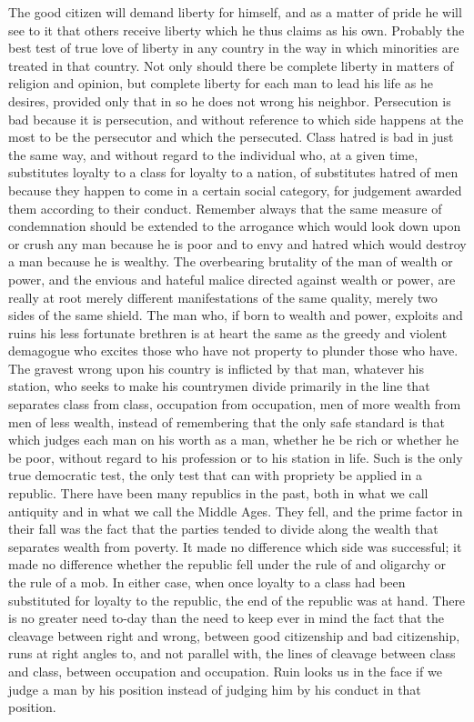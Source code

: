 \documentclass{scrbook}
\begin{document}
The good citizen will demand liberty for himself, and as a matter of pride he will see
to it that others receive liberty which he thus claims as his own. Probably the best test of
true love of liberty in any country in the way in which minorities are treated in that country.
Not only should there be complete liberty in matters of religion and opinion, but complete
liberty for each man to lead his life as he desires, provided only that in so he does not
wrong his neighbor. Persecution is bad because it is persecution, and without reference
to which side happens at the most to be the persecutor and which the persecuted. Class
hatred is bad in just the same way, and without regard to the individual who, at a given time,
substitutes loyalty to a class for loyalty to a nation, of substitutes hatred of men because they
happen to come in a certain social category, for judgement awarded them according to their
conduct. Remember always that the same measure of condemnation should be extended to
the arrogance which would look down upon or crush any man because he is poor and to envy
and hatred which would destroy a man because he is wealthy. The overbearing brutality of
the man of wealth or power, and the envious and hateful malice directed against wealth or
power, are really at root merely different manifestations of the same quality, merely two
sides of the same shield. The man who, if born to wealth and power, exploits and ruins
his less fortunate brethren is at heart the same as the greedy and violent demagogue who
excites those who have not property to plunder those who have. The gravest wrong upon his
country is inflicted by that man, whatever his station, who seeks to make his countrymen
divide primarily in the line that separates class from class, occupation from occupation, men
of more wealth from men of less wealth, instead of remembering that the only safe standard
is that which judges each man on his worth as a man, whether he be rich or whether he
be poor, without regard to his profession or to his station in life. Such is the only true
democratic test, the only test that can with propriety be applied in a republic. There have
been many republics in the past, both in what we call antiquity and in what we call the
Middle Ages. They fell, and the prime factor in their fall was the fact that the parties
tended to divide along the wealth that separates wealth from poverty. It made no difference
which side was successful; it made no difference whether the republic fell under the rule of
and oligarchy or the rule of a mob. In either case, when once loyalty to a class had been
substituted for loyalty to the republic, the end of the republic was at hand. There is no
greater need to-day than the need to keep ever in mind the fact that the cleavage between
right and wrong, between good citizenship and bad citizenship, runs at right angles to, and
not parallel with, the lines of cleavage between class and class, between occupation and
occupation. Ruin looks us in the face if we judge a man by his position instead of judging
him by his conduct in that position.
\end{document}
